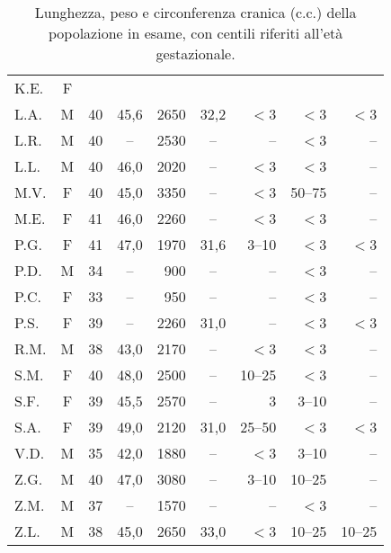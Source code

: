 \begin{table}[!h]
\begin{center}
\begin{tabular}{lcccrcrrr}
K.E.	& F	& & & & & & &  \\
L.A.	& M	& 40 & 45,6 & 2650 & 32,2 & $<$3  & $<$3   & $<$3 \\
L.R.	& M	& 40 & --   & 2530 & --   & --    & $<$3   & -- \\
L.L.	& M	& 40 & 46,0 & 2020 & --   & $<$3  & $<$3   & -- \\
M.V.	& F	& 40 & 45,0 & 3350 & --   & $<$3  & 50--75 & -- \\
M.E.	& F	& 41 & 46,0 & 2260 & --   & $<$3  & $<$3   & -- \\
P.G.	& F	& 41 & 47,0 & 1970 & 31,6 & 3--10 & $<$3   & $<$3 \\
P.D.	& M	& 34 & --   &  900 & --   & --    & $<$3   & -- \\
P.C.	& F	& 33 & --   &  950 & --   & --    & $<$3   & --  \\
P.S.	& F	& 39 & --   & 2260 & 31,0 & --    & $<$3   & $<$3 \\
R.M.	& M	& 38 & 43,0 & 2170 & --   & $<$3  & $<$3   & -- \\
S.M.	& F	& 40 & 48,0 & 2500 & --   & 10--25& $<$3   & --  \\
S.F.	& F	& 39 & 45,5 & 2570 & --   & 3     & 3--10  & -- \\
S.A.	& F	& 39 & 49,0 & 2120 & 31,0 & 25--50& $<$3   & $<$3 \\
V.D.	& M	& 35 & 42,0 & 1880 & --   & $<$3  & 3--10  & -- \\
Z.G.	& M	& 40 & 47,0 & 3080 & --   & 3--10 & 10--25 & -- \\
Z.M.	& M	& 37 & --   & 1570 & --   & --    & $<$3   & -- \\
Z.L.	& M	& 38 & 45,0 & 2650 & 33,0 & $<$3  & 10--25 & 10--25 \\
\bottomrule
\end{tabular}
\end{center}
\caption{Lunghezza, peso e circonferenza cranica (c.c.) della popolazione in esame, con centili riferiti all'età gestazionale.}
\label{tab:VariabiliNeonatali}
\end{table}

